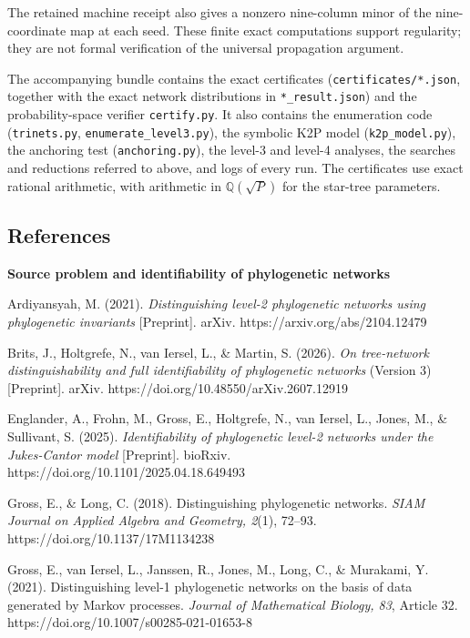 \documentclass[
  11pt,
]{article}
\begin{document}
The retained machine receipt also gives a nonzero nine-column minor of
the nine-coordinate map at each seed. These finite exact computations
support regularity; they are not formal verification of the universal
propagation argument.

The accompanying bundle contains the exact certificates
(\texttt{certificates/*.json}, together with the exact network
distributions in \texttt{*\_result.json}) and the probability-space
verifier \texttt{certify.py}. It also contains the enumeration code
(\texttt{trinets.py}, \texttt{enumerate\_level3.py}), the symbolic K2P
model (\texttt{k2p\_model.py}), the anchoring test
(\texttt{anchoring.py}), the level-3 and level-4 analyses, the searches
and reductions referred to above, and logs of every run. The
certificates use exact rational arithmetic, with arithmetic in
\(\mathbb{Q}(\sqrt{P})\) for the star-tree parameters.

\subsection{References}\label{references}

\textbf{Source problem and identifiability of phylogenetic networks}

Ardiyansyah, M. (2021). \emph{Distinguishing level-2 phylogenetic
networks using phylogenetic invariants} {[}Preprint{]}. arXiv.
https://arxiv.org/abs/2104.12479

Brits, J., Holtgrefe, N., van Iersel, L., \& Martin, S. (2026). \emph{On
tree-network distinguishability and full identifiability of phylogenetic
networks} (Version 3) {[}Preprint{]}. arXiv.
https://doi.org/10.48550/arXiv.2607.12919

Englander, A., Frohn, M., Gross, E., Holtgrefe, N., van Iersel, L.,
Jones, M., \& Sullivant, S. (2025). \emph{Identifiability of
phylogenetic level-2 networks under the Jukes-Cantor model}
{[}Preprint{]}. bioRxiv. https://doi.org/10.1101/2025.04.18.649493

Gross, E., \& Long, C. (2018). Distinguishing phylogenetic networks.
\emph{SIAM Journal on Applied Algebra and Geometry, 2}(1), 72--93.
https://doi.org/10.1137/17M1134238

Gross, E., van Iersel, L., Janssen, R., Jones, M., Long, C., \&
Murakami, Y. (2021). Distinguishing level-1 phylogenetic networks on the
basis of data generated by Markov processes. \emph{Journal of
Mathematical Biology, 83}, Article 32.
https://doi.org/10.1007/s00285-021-01653-8
\end{document}
